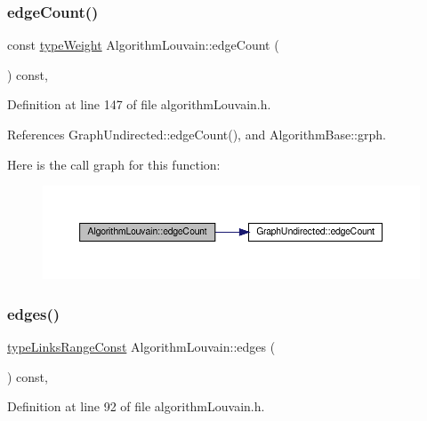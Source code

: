 \subsubsection{\texorpdfstring{edge\+Count()}{edgeCount()}}
{\footnotesize\ttfamily const \hyperlink{edge_8h_a2e7ea3be891ac8b52f749ec73fee6dd2}{type\+Weight} Algorithm\+Louvain\+::edge\+Count (\begin{DoxyParamCaption}{ }\end{DoxyParamCaption}) const\hspace{0.3cm}{\ttfamily [inline]}, {\ttfamily [private]}}



Definition at line 147 of file algorithm\+Louvain.\+h.



References Graph\+Undirected\+::edge\+Count(), and Algorithm\+Base\+::grph.

Here is the call graph for this function\+:
\nopagebreak
\begin{figure}[H]
\begin{center}
\leavevmode
\includegraphics[width=350pt]{classAlgorithmLouvain_aa4b25143d94b4fabc830ea053b76dd7d_cgraph}
\end{center}
\end{figure}
\mbox{\label{classAlgorithmLouvain_a6d5f1cfcbe2581bbe7bbe285392e0bdf}} 
\subsubsection{\texorpdfstring{edges()}{edges()}}
{\footnotesize\ttfamily \hyperlink{graphInterface_8h_ae8d27008f15586bbf419af7ad2e0a48a}{type\+Links\+Range\+Const} Algorithm\+Louvain\+::edges (\begin{DoxyParamCaption}{ }\end{DoxyParamCaption}) const\hspace{0.3cm}{\ttfamily [inline]}, {\ttfamily [private]}}



Definition at line 92 of file algorithm\+Louvain.\+h.



